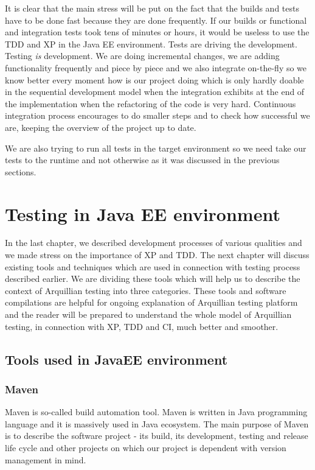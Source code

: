 \documentclass[12pt,final,oneside]{fithesis}
\begin{document}
It is clear that the main stress will be put on the fact that the builds and tests have to be done fast because they are done frequently. If our builds or functional and integration tests took tens of minutes or hours, it would be useless to use the TDD and XP in the Java EE environment. Tests are driving the development. Testing \emph{is} development. We are doing incremental changes, we are adding functionality frequently and piece by piece and we also integrate on-the-fly so we know better every moment how is our project doing which is only hardly doable in the sequential development model when the integration exhibits at the end of the implementation when the refactoring of the code is very hard. Continuous integration process encourages to do smaller steps and to check how successful we are, keeping the overview of the project up to date.

We are also trying to run all tests in the target environment so we need take our tests to the runtime and not otherwise as it was discussed in the previous sections.

\chapter{Testing in Java EE environment}

In the last chapter, we described development processes of various qualities and we made stress on the importance of XP and TDD. The next chapter will discuss existing tools and techniques which are used in connection with testing process described earlier. We are dividing these tools which will help us to describe the context of Arquillian testing into three categories. These tools and software compilations are helpful for ongoing explanation of Arquillian testing platform and the reader will be prepared to understand the whole model of Arquillian testing, in connection with XP, TDD and CI, much better and smoother.

	\section{Tools used in JavaEE environment}
	
		\subsection{Maven}

Maven is so-called build automation tool. Maven is written in Java programming language and it is massively used in Java ecosystem. The main purpose of Maven is to describe the software project - its build, its development, testing and release life cycle and other projects on which our project is dependent with version management in mind.
\end{document}

